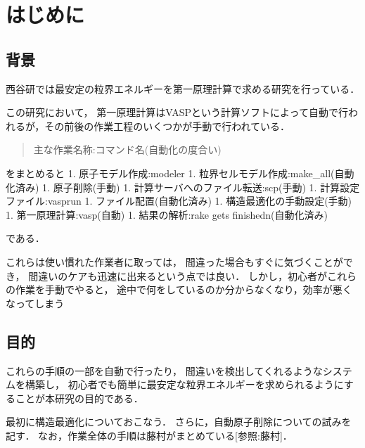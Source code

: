 \chapter{はじめに}\label{ux306fux3058ux3081ux306b}

    \section{背景}\label{ux80ccux666f}

    西谷研では最安定の粒界エネルギーを第一原理計算で求める研究を行っている．

この研究において，
第一原理計算はVASPという計算ソフトによって自動で行われるが，その前後の作業工程のいくつかが手動で行われている．

\begin{quote}
主な作業名称:コマンド名(自動化の度合い)
\end{quote}
をまとめると 1. 原子モデル作成:modeler 1.
粒界セルモデル作成:make\_all(自動化済み) 1. 原子削除(手動) 1.
計算サーバへのファイル転送:scp(手動) 1. 計算設定ファイル:vasprun 1.
ファイル配置(自動化済み) 1. 構造最適化の手動設定(手動) 1.
第一原理計算:vasp(自動) 1. 結果の解析:rake gets finishedn(自動化済み)

である．

これらは使い慣れた作業者に取っては，
間違った場合もすぐに気づくことができ，
間違いのケアも迅速に出来るという点では良い．
しかし，初心者がこれらの作業を手動でやると，
途中で何をしているのか分からなくなり，効率が悪くなってしまう

\section{目的}\label{ux76eeux7684}

これらの手順の一部を自動で行ったり，
間違いを検出してくれるようなシステムを構築し，
初心者でも簡単に最安定な粒界エネルギーを求められるようにすることが本研究の目的である．

最初に構造最適化についておこなう．
さらに，自動原子削除についての試みを記す．
なお，作業全体の手順は藤村がまとめている{[}参照:藤村{]}．

    